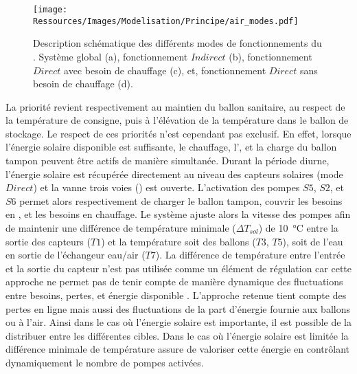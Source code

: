 \begin{figure}[tb]
    \centering
    \texttt{[image: Ressources/Images/Modelisation/Principe/air\_modes.pdf]}
    \caption[Description schématique des différents modes de fonctionnements du ]
            {Description schématique des différents modes de fonctionnements du . Système
             global (a), fonctionnement $Indirect$ (b), fonctionnement $Direct$ avec besoin de
             chauffage (c), et, fonctionnement $Direct$ sans besoin de chauffage (d).}
    \label{fig:schema_modes}
\end{figure}

La priorité revient respectivement au maintien du ballon sanitaire, au respect de la température de
consigne, puis à l’élévation de la température dans le ballon de stockage. Le respect de
ces priorités n’est cependant pas exclusif. En effet, lorsque l’énergie solaire disponible est
suffisante, le chauffage, l’, et la charge du ballon tampon peuvent être actifs de
manière simultanée.
Durant la période diurne, l’énergie solaire est récupérée directement au niveau des
capteurs solaires (mode $Direct$) et la vanne trois voies () est ouverte.
L’activation des pompes $S5$, $S2$, et $S6$ permet alors respectivement de charger le
ballon tampon, couvrir les besoins en , et les besoins en chauffage. Le système
ajuste alors la vitesse des pompes afin de maintenir une différence de température minimale
($\Delta T_{sol}$) de \SI{10}{\celsius} entre la sortie des capteurs ($T1$) et la
température soit des ballons ($T3$, $T5$), soit de l’eau en sortie de l’échangeur eau/air ($T7$).
La différence de température entre l’entrée et la sortie du capteur n’est pas utilisée comme un élément
de régulation car cette approche ne permet pas de tenir compte de manière dynamique
des fluctuations entre besoins, pertes, et énergie disponible \parencite{Mosallat2013686}.
L’approche retenue tient compte des pertes en ligne mais aussi des
fluctuations de la part d’énergie fournie aux ballons ou à l’air. Ainsi dans le cas où
l’énergie solaire est importante, il est possible de la distribuer entre les différentes
cibles. Dans le cas où l’énergie solaire est limitée la différence minimale de température
assure de valoriser cette énergie en contrôlant dynamiquement le nombre de pompes activées.

